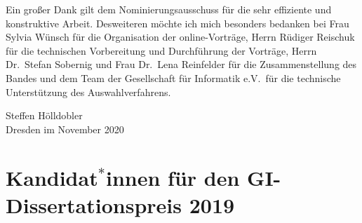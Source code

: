 \documentclass{lni}
\begin{document}
Ein gro\ss{}er Dank gilt dem Nominierungsausschuss für die sehr
effiziente und konstruktive Arbeit. Desweiteren möchte ich mich
besonders bedanken bei Frau Sylvia Wünsch für die Organisation der
online-Vorträge, Herrn Rüdiger Reischuk für die technischen
Vorbereitung und Durchführung der Vorträge, Herrn Dr.~Stefan Sobernig
und Frau Dr.~Lena Reinfelder für die Zusammenstellung des Bandes und
dem Team der Gesellschaft für Informatik e.V.\ für die technische
Unterstützung des Auswahlverfahrens.\bigskip

\noindent
Steffen Hölldobler\\
Dresden im November 2020

\vfill



\newpage

\section*{Kandidat$^*$innen f\"ur den GI-Dissertationspreis 2019}

\setlength{\tabcolsep}{0pt}
\end{document}
